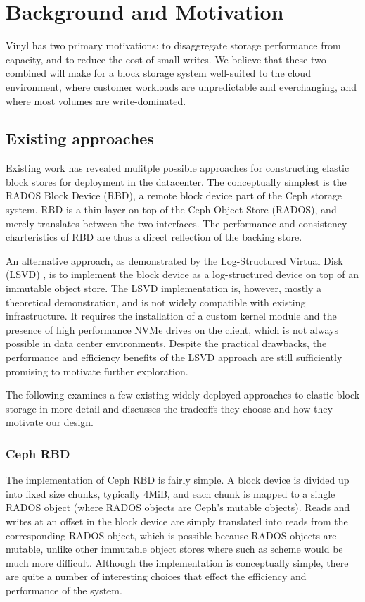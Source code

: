 \section{Background and Motivation}

Vinyl has two primary motivations: to disaggregate storage performance from
capacity, and to reduce the cost of small writes. We believe that these two
combined will make for a block storage system well-suited to the cloud
environment, where customer workloads are unpredictable and everchanging, and
where most volumes are write-dominated.

\subsection{Existing approaches}

Existing work has revealed mulitple possible approaches for constructing elastic
block stores for deployment in the datacenter. The conceptually simplest is the
RADOS Block Device (RBD), a remote block device part of the Ceph storage system.
RBD is a thin layer on top of the Ceph Object Store (RADOS), and merely
translates between the two interfaces. The performance and consistency
charteristics of RBD are thus a direct reflection of the backing store.

An alternative approach, as demonstrated by the Log-Structured Virtual Disk
(LSVD) \cite{lsvd}, is to implement the block device as a log-structured device
on top of an immutable object store. The LSVD implementation is, however, mostly
a theoretical demonstration, and is not widely compatible with existing
infrastructure. It requires the installation of a custom kernel module and the
presence of high performance NVMe drives on the client, which is not always
possible in data center environments. Despite the practical drawbacks, the
performance and efficiency benefits of the LSVD approach are still sufficiently
promising to motivate further exploration.

The following examines a few existing widely-deployed approaches to elastic
block storage in more detail and discusses the tradeoffs they choose and how
they motivate our design.

\subsubsection{Ceph RBD}

The implementation of Ceph RBD is fairly simple. A block device is divided up
into fixed size chunks, typically 4MiB, and each chunk is mapped to a single
RADOS object (where RADOS objects are Ceph's mutable objects). Reads and writes
at an offset in the block device are simply translated into reads from the
corresponding RADOS object, which is possible because RADOS objects are mutable,
unlike other immutable object stores where such as scheme would be much more
difficult. Although the implementation is conceptually simple, there are quite a
number of interesting choices that effect the efficiency and performance of the
system.

